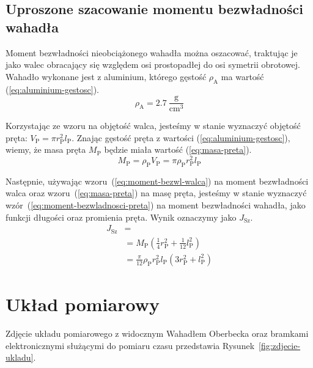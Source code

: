 \documentclass[twocolumn, a4paper, polish, 10pt]{article}
\newcommand{\JXn}[1]{\ensuremath{ J_{\mathrm{#1}} }}
\begin{document}
\subsection{Uproszone szacowanie momentu bezwładności wahadła}
Moment bezwładności nieobciążonego wahadła można oszacować, traktując je jako walec obracający się względem osi prostopadłej do osi symetrii obrotowej. Wahadło wykonane jest z aluminium, którego gęstość $\rho_{\mathrm{A}}$ ma wartość (\ref{eq:aluminium-gestosc}).
\begin{equation}
    \rho_{\mathrm{A}} = 2.7~\mathrm{ \frac{g}{cm^3} } 
    \label{eq:aluminium-gestosc}
\end{equation}

Korzystając ze wzoru na objętość walca, jesteśmy w stanie wyznaczyć objętość pręta: $V_{\mathrm{P}} = \pi r_{\mathrm{P}}^2 l_{\mathrm{P}}$. Znając gęstość pręta z wartości (\ref{eq:aluminium-gestosc}), wiemy, że masa pręta $M_{\mathrm{P}}$ będzie miała wartość (\ref{eq:masa-preta}).
\begin{equation}
    M_{\mathrm{P}}
    = \rho_{\mathrm{P}} V_{\mathrm{P}}
    = \pi \rho_{\mathrm{P}} r_{\mathrm{P}}^2 l_{\mathrm{P}}
    \label{eq:masa-preta}
\end{equation}

Następnie, używając wzoru~(\ref{eq:moment-bezwl-walca}) na moment bezwładności walca oraz wzoru~(\ref{eq:masa-preta}) na masę pręta, jesteśmy w stanie wyznaczyć wzór~(\ref{eq:moment-bezwladnosci-preta}) na moment bezwładności wahadła, jako funkcji długości oraz promienia pręta. Wynik oznaczymy jako $\JXn{Sz}$.
\begin{equation}
\begin{split}
    \JXn{Sz} &= \\
    &= M_{\mathrm{P}} \left(
        \frac{1}{4} r_\mathrm{P}^2 + \frac{1}{12} l_\mathrm{P}^2
    \right) \\
    &= \frac{\pi}{12} \rho_{\mathrm{P}} r_{\mathrm{P}}^2 l_{\mathrm{P}} \left(
        3 r_\mathrm{P}^2 + l_\mathrm{P}^2
    \right)
    \label{eq:moment-bezwladnosci-preta}
\end{split}
\end{equation}

\section{Układ pomiarowy}
Zdjęcie układu pomiarowego z widocznym Wahadłem Oberbecka oraz bramkami elektronicznymi służącymi do pomiaru czasu przedstawia Rysunek~\ref{fig:zdjecie-ukladu}.
\end{document}
